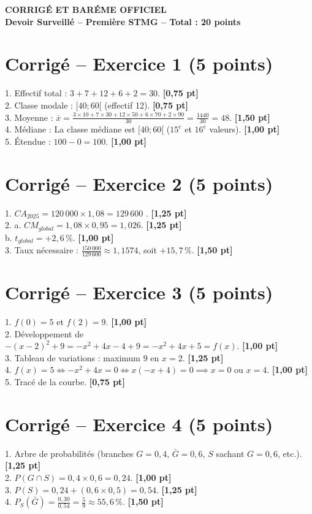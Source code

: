 \documentclass[12pt,a4paper]{article}
\begin{document}
\begin{center}
    {\LARGE \textbf{CORRIGÉ ET BARÉME OFFICIEL}}\\[0.20cm]
    {\large \textbf{Devoir Surveillé -- Première STMG -- Total : 20 points}}
\end{center}

\vspace{0.4cm}

\section*{Corrigé -- Exercice 1 (5 points)}
1. Effectif total : $3 + 7 + 12 + 6 + 2 = 30$. \textbf{[0,75 pt]}\\
2. Classe modale : $[40 ; 60[$ (effectif 12). \textbf{[0,75 pt]}\\
3. Moyenne : $\bar{x} = \frac{3\times10 + 7\times30 + 12\times50 + 6\times70 + 2\times90}{30} = \frac{1440}{30} = 48$. \textbf{[1,50 pt]}\\
4. Médiane : La classe médiane est $[40 ; 60[$ ($15^e$ et $16^e$ valeurs). \textbf{[1,00 pt]}\\
5. Étendue : $100 - 0 = 100$. \textbf{[1,00 pt]}

\section*{Corrigé -- Exercice 2 (5 points)}
1. $CA_{2025} = 120\,000 \times 1{,}08 = 129\,600$ \texteuro{}. \textbf{[1,25 pt]}\\
2. a. $CM_{global} = 1{,}08 \times 0{,}95 = 1{,}026$. \textbf{[1,25 pt]}\\
b. $t_{global} = +2{,}6\,\%$. \textbf{[1,00 pt]}\\
3. Taux nécessaire : $\frac{150\,000}{129\,600} \approx 1{,}1574$, soit $+15{,}7\,\%$. \textbf{[1,50 pt]}

\section*{Corrigé -- Exercice 3 (5 points)}
1. $f(0) = 5$ et $f(2) = 9$. \textbf{[1,00 pt]}\\
2. Développement de $-(x-2)^2 + 9 = -x^2+4x-4+9 = -x^2+4x+5 = f(x)$. \textbf{[1,00 pt]}\\
3. Tableau de variations : maximum $9$ en $x=2$. \textbf{[1,25 pt]}\\
4. $f(x) = 5 \iff -x^2+4x = 0 \iff x(-x+4) = 0 \implies x=0$ ou $x=4$. \textbf{[1,00 pt]}\\
5. Tracé de la courbe. \textbf{[0,75 pt]}

\section*{Corrigé -- Exercice 4 (5 points)}
1. Arbre de probabilités (branches $G=0{,}4$, $\bar{G}=0{,}6$, $S$ sachant $G=0{,}6$, etc.). \textbf{[1,25 pt]}\\
2. $P(G \cap S) = 0{,}4 \times 0{,}6 = 0{,}24$. \textbf{[1,00 pt]}\\
3. $P(S) = 0{,}24 + (0{,}6 \times 0{,}5) = 0{,}54$. \textbf{[1,25 pt]}\\
4. $P_S(\bar{G}) = \frac{0{,}30}{0{,}54} = \frac{5}{9} \approx 55{,}6\,\%$. \textbf{[1,50 pt]}
\end{document}
